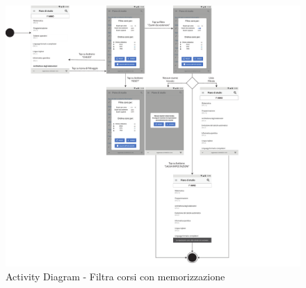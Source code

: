 \begin{figure}
	\centering
	\includegraphics[width=6in]{imgs/gruppo1/activity_diagrams/AD3_filtra_corsi.pdf}
	\caption{Activity Diagram - Filtra corsi con memorizzazione}
	\label{diag:filtraCorsiConMemAD}
\end{figure}
\newpage

